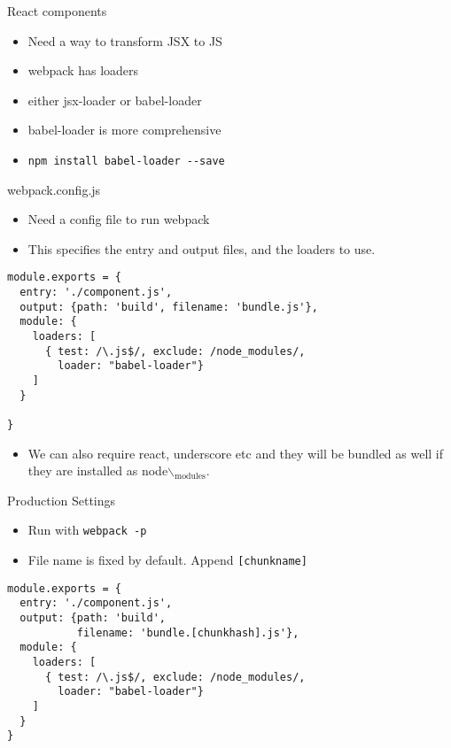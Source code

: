 \documentclass[presentation]{beamer}
\begin{document}
\begin{frame}[fragile,label={sec:orgheadline6}]{React components}
 \begin{itemize}
\item Need a way to transform JSX to JS
\item webpack has loaders
\item either jsx-loader or babel-loader
\item babel-loader is more comprehensive
\item \texttt{npm install babel-loader -{}-save}
\end{itemize}
\end{frame}

\begin{frame}[fragile,label={sec:orgheadline7}]{webpack.config.js}
 \begin{itemize}
\item Need a config file to run webpack
\item This specifies the entry and output files, and the loaders to use.
\end{itemize}

\begin{verbatim}
module.exports = {
  entry: './component.js',
  output: {path: 'build', filename: 'bundle.js'},
  module: {
    loaders: [
      { test: /\.js$/, exclude: /node_modules/,
        loader: "babel-loader"}
    ]
  }

}
\end{verbatim}

\begin{itemize}
\item We can also require react, underscore etc and they will be bundled as well
if they are installed as node$\backslash$\(_{\text{modules}}\).
\end{itemize}
\end{frame}

\begin{frame}[fragile,label={sec:orgheadline8}]{Production Settings}
 \begin{itemize}
\item Run with \texttt{webpack -p}
\item File name is fixed by default. Append \texttt{[chunkname]}
\end{itemize}
\begin{verbatim}
module.exports = {
  entry: './component.js',
  output: {path: 'build',
           filename: 'bundle.[chunkhash].js'},
  module: {
    loaders: [
      { test: /\.js$/, exclude: /node_modules/,
        loader: "babel-loader"}
    ]
  }
}
\end{verbatim}
\end{frame}
\end{document}

